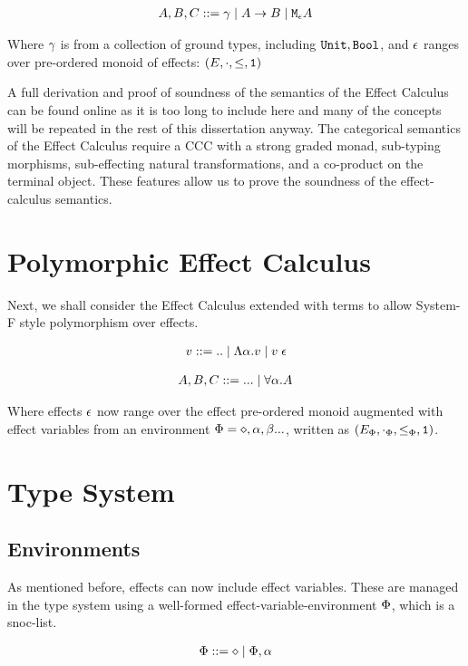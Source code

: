 \documentclass{Report}
\begin{document}
\begin{align}
    A, B, C ::= \g\mid \ab \mid\mea
\end{align}

Where $\g$ is from a collection of ground types, including $\U, \B$, and $\e$ ranges over pre-ordered monoid of effects: $(E, \dot, \subeffect, \1)$


A full derivation and proof of soundness of the semantics of the Effect Calculus can be found online  as it is too long to include here and many of the concepts will be repeated in the rest of this dissertation anyway. The categorical semantics of the Effect Calculus require a CCC with a strong graded monad, sub-typing morphisms, sub-effecting natural transformations, and a co-product on the terminal object. These features allow us to prove the soundness of the effect-calculus semantics.

\section{Polymorphic Effect Calculus}
Next, we shall consider the Effect Calculus extended with terms to allow System-F style polymorphism over effects.

\begin{align}
    v::=\text{..}\mid\elam{\a}{v}\mid\eapp{v}{\e}
\end{align}

\begin{align}
    A, B, C::=\text{...}\mid \all{\a}{A}
\end{align}

Where effects $\e$ now range over the effect pre-ordered monoid augmented with effect variables from an environment $\P = \nil, \a, \b ...$, written as $(E_\P, \dotp, \subeffectp, \1)$.

\section{Type System}
\subsection{Environments}
As mentioned before, effects can now include effect variables. These are managed in the type system using a well-formed effect-variable-environment $\P$, which is a snoc-list.

\begin{align}
    \P ::= \nil \mid \P, \a
\end{align}
\end{document}
